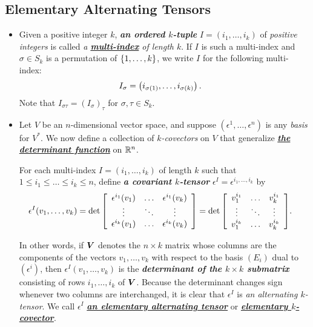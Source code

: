 \documentclass[11pt]{article}
\begin{document}
\subsection{Elementary Alternating Tensors}
\begin{itemize}
\item \begin{definition}
Given a positive integer $k$, \emph{\textbf{an ordered $k$-tuple}} $I=(i_1,\ldots, i_k)$ of \emph{positive integers} is called \emph{a \underline{\textbf{multi-index}} of length $k$}. If $I$ is such a multi-index and  $\sigma \in S_k$ is a permutation of $\left\{1,\ldots,k\right\}$, we write $I$ for the following multi-index:
\begin{align*}
I_{\sigma} &= \left(i_{\sigma(1)},\ldots, i_{\sigma(k)}\right).
\end{align*} Note that $I_{\sigma\tau}= (I_{\sigma})_{\tau}$ for $\sigma, \tau \in S_k$.
\end{definition}

\item \begin{definition}
Let $V$ be an $n$-dimensional vector space, and suppose $(\epsilon^1,\ldots, \epsilon^n)$ is any \emph{basis} for $V^{*}$. We now define a collection of \emph{$k$-covectors} on $V$ that generalize \underline{\emph{\textbf{the determinant function}}} on ${\mathbb R}^n$. 

For each multi-index $I=(i_1,\ldots, i_k)$ of length $k$ such that $1\le i_1\le \ldots \le i_k \le n$, define \emph{\textbf{a covariant $k$-tensor}} $\epsilon^I = \epsilon^{i_1,\ldots, i_k}$ by
\begin{align}
\epsilon^I(v_1, \ldots, v_k) &= \det{\left[\begin{array}{ccc}
\epsilon^{i_1}(v_1) & \ldots & \epsilon^{i_1}(v_k)\\
\vdots & \ddots & \vdots \\
\epsilon^{i_k}(v_1) & \ldots & \epsilon^{i_k}(v_k)
\end{array}\right]} = \det{\left[ \begin{array}{ccc}
v_1^{i_1} & \ldots & v_k^{i_1}\\
\vdots & \ddots & \vdots \\
v_1^{i_k} & \ldots & v_k^{i_k}
\end{array}  \right]}.   \label{eqn: elementary_alt_tensor}
\end{align} 

In other words, if $\boldsymbol{V}$ denotes the $n \times k$ matrix whose columns are the components of the vectors $v_1,\ldots,v_k$ with respect to the basis $(E_i)$ dual to $(\epsilon^i)$, then $\epsilon^I(v_1, \ldots, v_k)$ is the \emph{\textbf{determinant of the $k\times k$ submatrix}} consisting of rows $i_1,\ldots, i_k$ of $\boldsymbol{V}$. Because the determinant changes sign whenever two columns are interchanged, it is clear that $\epsilon^I$ is \emph{an alternating $k$-tensor}. We call $\epsilon^I$ \underline{\emph{\textbf{an elementary alternating tensor}}} or \underline{\emph{\textbf{elementary $k$-covector}}}.
\end{definition}


\end{itemize}
\end{document}
